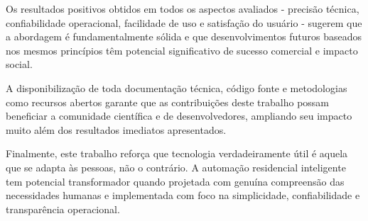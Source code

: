Os resultados positivos obtidos em todos os aspectos avaliados - precisão técnica, confiabilidade operacional, facilidade de uso e satisfação do usuário - sugerem que a abordagem é fundamentalmente sólida e que desenvolvimentos futuros baseados nos mesmos princípios têm potencial significativo de sucesso comercial e impacto social.

A disponibilização de toda documentação técnica, código fonte e metodologias como recursos abertos garante que as contribuições deste trabalho possam beneficiar a comunidade científica e de desenvolvedores, ampliando seu impacto muito além dos resultados imediatos apresentados.

Finalmente, este trabalho reforça que tecnologia verdadeiramente útil é aquela que se adapta às pessoas, não o contrário. A automação residencial inteligente tem potencial transformador quando projetada com genuína compreensão das necessidades humanas e implementada com foco na simplicidade, confiabilidade e transparência operacional.






